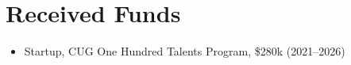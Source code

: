 \section*{Received Funds}

\begin{itemize}
\item Startup, CUG One Hundred Talents Program, \$280k (2021--2026)
\end{itemize}
